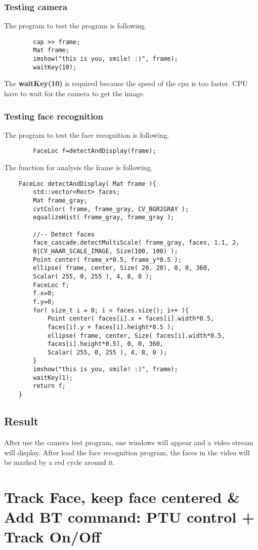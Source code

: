\documentclass{article}
\begin{document}
\subsubsection{Testing camera}
	The program to test the program is following.
	\begin{lstlisting}
		cap >> frame;
		Mat frame;
		imshow("this is you, smile! :)", frame);
		waitKey(10);
	\end{lstlisting}
	The \textbf{waitKey(10)} is required because the speed of the cpu is too faster. CPU have to wait for the camera to get the image.
\subsubsection{Testing face recognition}
	The program to test the face recognition is following.
	\begin{lstlisting}
		FaceLoc f=detectAndDisplay(frame);
	\end{lstlisting}
	The function for analysis the frame is following.
	\begin{lstlisting}
	FaceLoc detectAndDisplay( Mat frame ){
		std::vector<Rect> faces;
		Mat frame_gray;
		cvtColor( frame, frame_gray, CV_BGR2GRAY );
		equalizeHist( frame_gray, frame_gray );
		
		//-- Detect faces
		face_cascade.detectMultiScale( frame_gray, faces, 1.1, 2,
		0|CV_HAAR_SCALE_IMAGE, Size(100, 100) );
		Point center( frame_x*0.5, frame_y*0.5 );
		ellipse( frame, center, Size( 20, 20), 0, 0, 360, 
		Scalar( 255, 0, 255 ), 4, 8, 0 );
		FaceLoc f;
		f.x=0;
		f.y=0;
		for( size_t i = 0; i < faces.size(); i++ ){
			Point center( faces[i].x + faces[i].width*0.5,
			faces[i].y + faces[i].height*0.5 );
			ellipse( frame, center, Size( faces[i].width*0.5,
			faces[i].height*0.5), 0, 0, 360, 
			Scalar( 255, 0, 255 ), 4, 8, 0 );
		}
		imshow("this is you, smile! :)", frame);
		waitKey(1);
		return f;
	}
	\end{lstlisting}
\subsection{Result}
After use the camera test program, one windows will appear and a video stream will display.
After load the face recognition program, the faces in the video will be marked by a red cycle around it.
\clearpage
\section{Track Face, keep face centered \& Add BT command: PTU control + Track On/Off}
\end{document}
